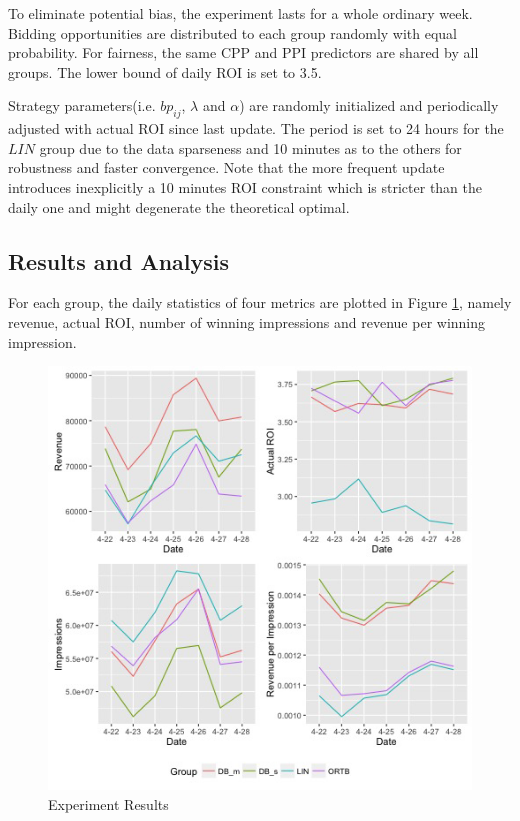\documentclass[sigconf]{acmart}
\newcommand{\sbp}{bp_{ij}}
\begin{document}
To eliminate potential bias, the experiment lasts for a whole ordinary week.
Bidding opportunities are distributed to each group randomly with equal probability.
For fairness, the same CPP and PPI predictors are shared by all groups.
The lower bound of daily ROI is set to 3.5.

Strategy parameters(i.e. $\sbp$, $\lambda$ and $\alpha$) are randomly initialized and
    periodically adjusted with actual ROI since last update.
The period is set to 24 hours for the $LIN$ group due to the data sparseness
    and 10 minutes as to the others for robustness and faster convergence.
Note that the more frequent update introduces inexplicitly a 10 minutes ROI constraint
    which is stricter than the daily one and might degenerate the theoretical optimal.

\subsection{Results and Analysis}

For each group, the daily statistics of four metrics are plotted in Figure \ref{Result},
    namely revenue, actual ROI, number of winning impressions and revenue per winning impression.

\begin{figure}[!h]
\centering
\includegraphics[width=1.0\linewidth]{./Result.jpg}
\caption{Experiment Results\label{Result}}
\end{figure}
\end{document}
